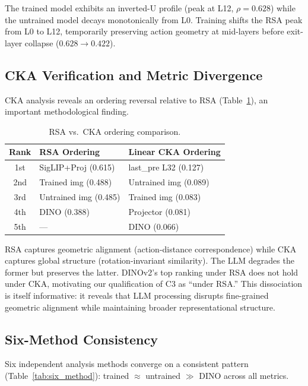 \documentclass[10pt,twocolumn]{article}
\begin{document}
The trained model exhibits an inverted-U profile (peak at L12, $\rho = 0.628$) while the untrained model decays monotonically from L0.
Training shifts the RSA peak from L0 to L12, temporarily preserving action geometry at mid-layers before exit-layer collapse ($0.628 \to 0.422$).

\subsection{CKA Verification and Metric Divergence}
\label{sec:cka}

CKA analysis reveals an ordering reversal relative to RSA (Table~\ref{tab:cka}), an important methodological finding.

\begin{table}[t]
\centering
\caption{RSA vs.\ CKA ordering comparison.}
\label{tab:cka}
\small
\begin{tabular}{cll}
\toprule
Rank & RSA Ordering & Linear CKA Ordering \\
\midrule
1st & SigLIP+Proj (0.615) & last\_pre L32 (0.127) \\
2nd & Trained img (0.488) & Untrained img (0.089) \\
3rd & Untrained img (0.485) & Trained img (0.083) \\
4th & DINO (0.388) & Projector (0.081) \\
5th & --- & DINO (0.066) \\
\bottomrule
\end{tabular}
\end{table}

RSA captures geometric alignment (action-distance correspondence) while CKA captures global structure (rotation-invariant similarity).
The LLM degrades the former but preserves the latter.
DINOv2's top ranking under RSA does not hold under CKA, motivating our qualification of C3 as ``under RSA.''
This dissociation is itself informative: it reveals that LLM processing disrupts fine-grained geometric alignment while maintaining broader representational structure.

\subsection{Six-Method Consistency}
\label{sec:six_method}

Six independent analysis methods converge on a consistent pattern (Table~\ref{tab:six_method}): trained $\approx$ untrained $\gg$ DINO across all metrics.
\end{document}
